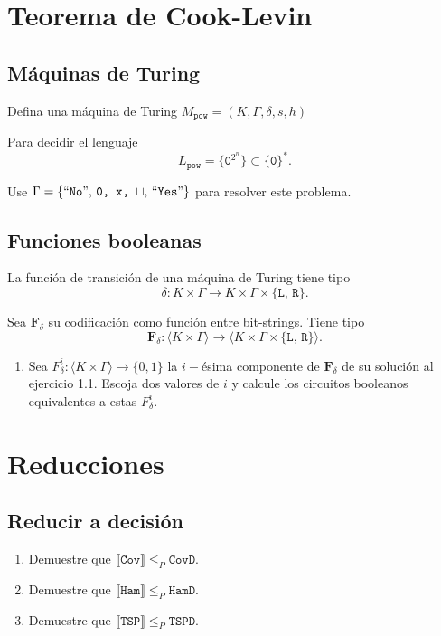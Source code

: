 


\maketitle

\section{Teorema de Cook-Levin}
\subsection{Máquinas de Turing} Defina una máquina de Turing
\(
	M_\texttt{pow}= (K, \Gamma, \delta, s, h)
\)

Para decidir el lenguaje
\[
	L_\texttt{pow}= \{\texttt{0}^{2^n}\} \subset \{\texttt{0}\}^*
	.
\]

Use
\(
	\Gamma=
	\{
		\mbox{``\texttt{No}'', \texttt{0, x, }$\sqcup$,\ ``\texttt{Yes}''}
	\}
\)
para resolver este problema.

\subsection{Funciones booleanas} La función de transición de una máquina de Turing
tiene tipo
\[
	\delta : K \times \Gamma \to K \times \Gamma \times
			\{
				\texttt{L, R}
			\}
			.
\]

Sea 
\(
	\mathbf{F}_\delta
\)
su codificación como función entre bit-strings. Tiene tipo 
\[
	\mathbf{F}_\delta :
		\langle
			K \times \Gamma
		\rangle
			\to
		\langle
			K \times \Gamma \times
				\{
					\texttt{L, R}
				\}
		\rangle
		.
\]

\begin{enumerate}
		\item Sea
		\(
			F_\delta^i :
				\langle
					K \times \Gamma
				\rangle
					\to
				\{
					0, 1
				\}
		\)
		la $i-$ésima componente de
		\(
			\mathbf{F}_\delta
		\)
		de su solución al ejercicio 1.1. Escoja dos valores de $i$ y
		calcule los circuitos booleanos equivalentes a estas
		\(
			F_\delta^i
		\).
\end{enumerate}


\section{Reducciones}

\subsection{Reducir a decisión}
\begin{enumerate}
	\item Demuestre que
		\(
			\llbracket
			\texttt{Cov}
			\rrbracket
			\leq_P
			\texttt{CovD}
		\).
	\item Demuestre que
		\(
			\llbracket
			\texttt{Ham}
			\rrbracket
			\leq_P
			\texttt{HamD}
		\).
	\item Demuestre que
		\(
			\llbracket
			\texttt{TSP}
			\rrbracket
			\leq_P
			\texttt{TSPD}
		\).
\end{enumerate}

